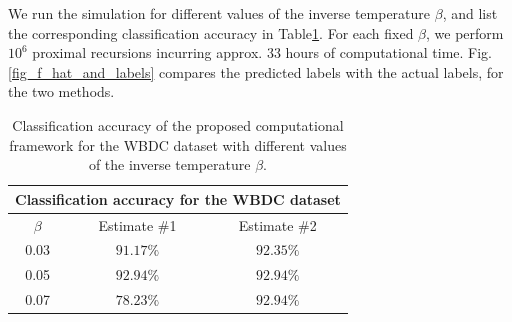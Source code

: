 \documentclass{article}
\begin{document}
We run the simulation for different values of the inverse temperature $\beta$, and list the corresponding classification accuracy in Table\ref{tab:accuracy}. For each fixed $\beta$, we perform $10^{6}$ proximal recursions incurring approx. 33 hours of computational time. Fig. \ref{fig_f_hat_and_labels} compares the predicted labels with the actual labels, for the two methods. 

\begin{table}[h!]
\centering
 \begin{tabular}{|c c c|} 
 \hline
  \multicolumn{3}{|c|}{Classification accuracy for the WBDC dataset} \\
 \hline\hline
 $\beta$ & Estimate \#1 & Estimate \#2  \\  
 \hline
 0.03  & $91.17\%$ & $92.35\%$\\
 0.05&    $92.94 \%$ &  $92.94 \%$   \\
 0.07 &$78.23\%$ & $92.94\%$\\
 \hline
 \end{tabular}
     \caption{Classification accuracy of the proposed computational framework for the WBDC dataset with different values of the inverse temperature $\beta$.}
\label{tab:accuracy}
\end{table}


\end{document}
